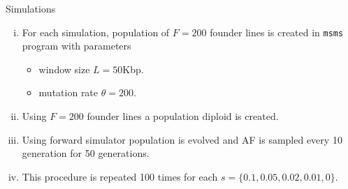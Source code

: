 \documentclass[t]{beamer} %
\begin{document}
\begin{frame}{Simulations}
\begin{enumerate}[(i)]
\item For each simulation, population of $F=200$ founder lines is created in  \texttt{msms} program with parameters 
\begin{itemize}
\item window size $L=50$Kbp.
\item mutation rate $\theta=200$.
\end{itemize}

\item Using $F=200$ founder lines a population diploid is created.
\item Using forward simulator population is evolved and AF is sampled every 10 generation for 50 generations. 
\item This procedure is repeated 100 times for each $s=\{0.1, 0.05, 0.02, 0.01, 0\}$.
\end{enumerate}
\end{frame}


\end{document}

